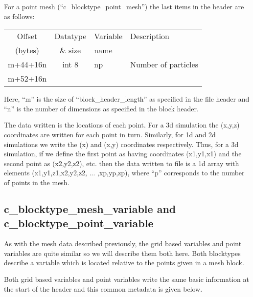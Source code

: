 \documentclass[12pt]{article}
\begin{document}
For a point mesh (``c\_blocktype\_point\_mesh'') the last items in the header
are as follows:\\

\begin{center}
\begin{tabularx}{0.9\textwidth}[!hbt]{cclX}
  Offset & Datatype & Variable & Description\\
  (bytes) & \& size & name &
  \\\toprule

  m+44+16n & int 8 & np & Number of particles
  \\\midrule

  m+52+16n &
\end{tabularx}
\end{center}\vspace{10pt}

Here, ``m'' is the size of ``block\_header\_length'' as specified in the file
header and ``n'' is the number of dimensions as specified in the block header.

The data written is the locations of each point. For a 3d simulation the
(x,y,z) coordinates are written for each point in turn. Similarly, for
1d and 2d simulations we write the (x) and (x,y) coordinates respectively.
Thus, for a 3d simulation, if we define the first point as having coordinates
(x1,y1,x1) and the second point as (x2,y2,z2), etc. then the data written
to file is a 1d array with elements (x1,y1,z1,x2,y2,z2, ... ,xp,yp,zp), where
``p'' corresponds to the number of points in the mesh.

\subsection{c\_blocktype\_mesh\_variable and c\_blocktype\_point\_variable}

As with the mesh data described previously, the grid based variables and
point variables are quite similar so we will describe them both here.
Both blocktypes describe a variable which is located relative to the points
given in a mesh block.

Both grid based variables and point variables write the same basic information
at the start of the header and this common metadata is given below.\\
\end{document}
